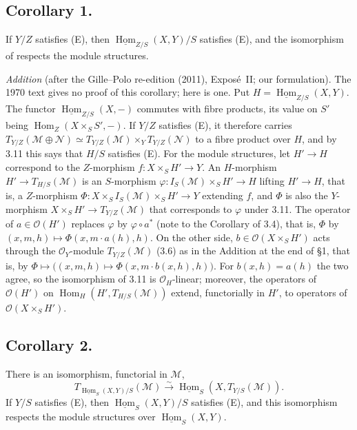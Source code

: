 \subsection*{Corollary 1.}
If \(Y/Z\) satisfies (E), then
\(\underline{\operatorname{Hom}}_{Z/S}(X,Y)/S\) satisfies (E), and the
isomorphism of  respects the module structures.

\par\medskip\noindent
\emph{Addition} (after the Gille--Polo re-edition (2011), Expos\'e~II; our
formulation). The 1970 text gives no proof of this corollary; here is one.
Put \(H=\underline{\operatorname{Hom}}_{Z/S}(X,Y)\). The functor
\(\underline{\operatorname{Hom}}_{Z/S}(X,-)\) commutes with fibre products,
its value on \(S'\) being \(\operatorname{Hom}_Z(X\times_SS',-)\). If
\(Y/Z\) satisfies (E), it therefore carries
\(T_{Y/Z}(\mathcal M\oplus\mathcal N)\simeq
T_{Y/Z}(\mathcal M)\times_YT_{Y/Z}(\mathcal N)\) to a fibre product over
\(H\), and by 3.11 this says that \(H/S\) satisfies (E). For the module
structures, let \(H'\to H\) correspond to the \(Z\)-morphism
\(f\colon X\times_SH'\to Y\). An \(H\)-morphism
\(H'\to T_{H/S}(\mathcal M)\) is an \(S\)-morphism
\(\varphi\colon I_S(\mathcal M)\times_SH'\to H\) lifting \(H'\to H\), that
is, a \(Z\)-morphism \(\Phi\colon X\times_SI_S(\mathcal M)\times_SH'\to Y\)
extending \(f\), and \(\Phi\) is also the \(Y\)-morphism
\(X\times_SH'\to T_{Y/Z}(\mathcal M)\) that corresponds to \(\varphi\) under
3.11. The operator of \(a\in\mathcal O(H')\) replaces \(\varphi\) by
\(\varphi\circ a^*\) (note to the Corollary of 3.4), that is, \(\Phi\) by
\((x,m,h)\mapsto\Phi(x,m\cdot a(h),h)\). On the other side,
\(b\in\mathcal O(X\times_SH')\) acts through the \(\mathcal O_Y\)-module
\(T_{Y/Z}(\mathcal M)\) (3.6) as in the Addition at the end of \S1, that
is, by \(\Phi\mapsto\bigl((x,m,h)\mapsto\Phi(x,m\cdot b(x,h),h)\bigr)\).
For \(b(x,h)=a(h)\) the two agree, so the isomorphism of 3.11 is
\(\mathcal O_H\)-linear; moreover, the operators of \(\mathcal O(H')\) on
\(\operatorname{Hom}_H(H',T_{H/S}(\mathcal M))\) extend, functorially in
\(H'\), to operators of \(\mathcal O(X\times_SH')\).
\par\medskip

\subsection*{Corollary 2.}
There is an isomorphism, functorial in \(\mathcal M\),
\[
  T_{\underline{\operatorname{Hom}}_S(X,Y)/S}(\mathcal M)
  \xrightarrow{\sim}
  \underline{\operatorname{Hom}}_S(X,T_{Y/S}(\mathcal M)).
\]
If \(Y/S\) satisfies (E), then
\(\underline{\operatorname{Hom}}_S(X,Y)/S\) satisfies (E), and this
isomorphism respects the module structures over
\(\underline{\operatorname{Hom}}_S(X,Y)\).

